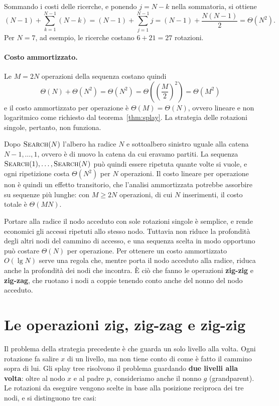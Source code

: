 \noindent
Sommando i costi delle ricerche, e ponendo $j = N-k$ nella sommatoria, si ottiene
\[
(N-1) + \sum_{k=1}^{N-1} (N-k) = (N-1) + \sum_{j=1}^{N-1} j = (N-1) + \frac{N(N-1)}{2} = \Theta(N^2).
\]
Per $N = 7$, ad esempio, le ricerche costano $6 + 21 = 27$ rotazioni.

\paragraph{Costo ammortizzato.}
Le $M = 2N$ operazioni della sequenza costano quindi
\[
\Theta(N) + \Theta(N^2) = \Theta(N^2) = \Theta\!\left(\left(\frac{M}{2}\right)^2\right) = \Theta(M^2)
\]
e il costo ammortizzato per operazione è $\Theta(M) = \Theta(N)$, ovvero lineare e non logaritmico come richiesto dal teorema~\ref{thm:splay}. La strategia delle rotazioni singole, pertanto, non funziona.

\begin{osservazione}
Dopo $\textsc{Search}(N)$ l'albero ha radice $N$ e sottoalbero sinistro uguale alla catena $N-1, \dots, 1$, ovvero è di nuovo la catena da cui eravamo partiti. La sequenza $\textsc{Search}(1), \dots, \textsc{Search}(N)$ può quindi essere ripetuta quante volte si vuole, e ogni ripetizione costa $\Theta(N^2)$ per $N$ operazioni. Il costo lineare per operazione non è quindi un effetto transitorio, che l'analisi ammortizzata potrebbe assorbire su sequenze più lunghe: con $M \ge 2N$ operazioni, di cui $N$ inserimenti, il costo totale è $\Theta(MN)$.
\end{osservazione}

Portare alla radice il nodo acceduto con sole rotazioni singole è semplice, e rende economici gli accessi ripetuti allo stesso nodo. Tuttavia non riduce la profondità degli altri nodi del cammino di accesso, e una sequenza scelta in modo opportuno può costare $\Theta(N)$ per operazione. Per ottenere un costo ammortizzato $O(\lg N)$ serve una regola che, mentre porta il nodo acceduto alla radice, riduca anche la profondità dei nodi che incontra. È ciò che fanno le operazioni \textbf{zig-zig} e \textbf{zig-zag}, che ruotano i nodi a coppie tenendo conto anche del nonno del nodo acceduto.

\section{Le operazioni zig, zig-zag e zig-zig}\label{sec:zig}
Il problema della strategia precedente è che guarda un solo livello alla volta. Ogni rotazione fa salire $x$ di un livello, ma non tiene conto di come è fatto il cammino sopra di lui. Gli splay tree risolvono il problema guardando \textbf{due livelli alla volta}: oltre al nodo $x$ e al padre $p$, consideriamo anche il nonno $g$ (grandparent). Le rotazioni da eseguire vengono scelte in base alla posizione reciproca dei tre nodi, e si distinguono tre casi:

